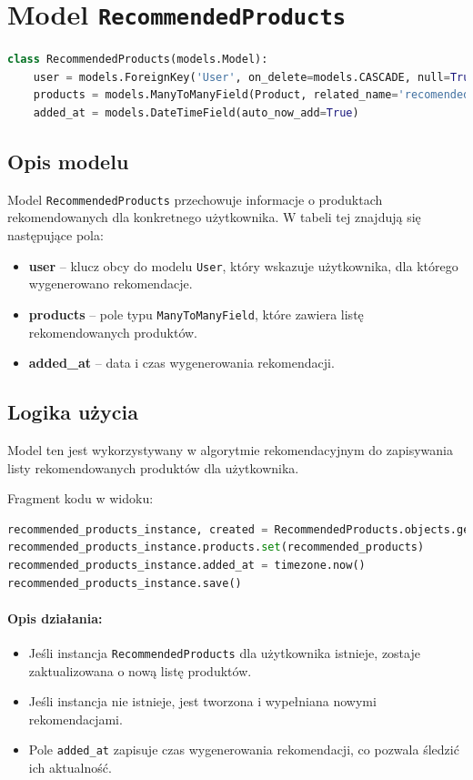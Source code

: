 \documentclass[12pt,a4paper,oneside]{article}
\theoremstyle{definition}
\numberwithin{equation}{section}
\begin{document}
% 
% 
\section{Model \texttt{RecommendedProducts}}

\begin{lstlisting}[language=Python]
class RecommendedProducts(models.Model):
    user = models.ForeignKey('User', on_delete=models.CASCADE, null=True, blank=True)
    products = models.ManyToManyField(Product, related_name='recomended_products')
    added_at = models.DateTimeField(auto_now_add=True)
\end{lstlisting}

\subsection*{Opis modelu}
Model \texttt{RecommendedProducts} przechowuje informacje o produktach rekomendowanych dla konkretnego użytkownika. W tabeli tej znajdują się następujące pola:
\begin{itemize}
    \item \textbf{user} -- klucz obcy do modelu \texttt{User}, który wskazuje użytkownika, dla którego wygenerowano rekomendacje.
    \item \textbf{products} -- pole typu \texttt{ManyToManyField}, które zawiera listę rekomendowanych produktów.
    \item \textbf{added\_at} -- data i czas wygenerowania rekomendacji.
\end{itemize}

\subsection*{Logika użycia}
Model ten jest wykorzystywany w algorytmie rekomendacyjnym do zapisywania listy rekomendowanych produktów dla użytkownika. 

Fragment kodu w widoku:

\begin{lstlisting}[language=Python]
recommended_products_instance, created = RecommendedProducts.objects.get_or_create(user=user)
recommended_products_instance.products.set(recommended_products)
recommended_products_instance.added_at = timezone.now()
recommended_products_instance.save()
\end{lstlisting}

\paragraph{Opis działania:}
\begin{itemize}
    \item Jeśli instancja \texttt{RecommendedProducts} dla użytkownika istnieje, zostaje zaktualizowana o nową listę produktów.
    \item Jeśli instancja nie istnieje, jest tworzona i wypełniana nowymi rekomendacjami.
    \item Pole \texttt{added\_at} zapisuje czas wygenerowania rekomendacji, co pozwala śledzić ich aktualność.
\end{itemize}
\end{document}
